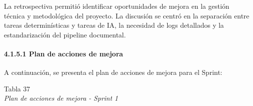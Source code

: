 \documentclass[12pt,a4paper,oneside]{report}
\begin{document}
La retrospectiva permitió identificar oportunidades de mejora en la
gestión técnica y metodológica del proyecto. La discusión se centró en
la separación entre tareas determinísticas y tareas de IA, la necesidad
de logs detallados y la estandarización del pipeline documental.

\paragraph{4.1.5.1 Plan de acciones de
mejora}\label{plan-de-acciones-de-mejora}

A continuación, se presenta el plan de acciones de mejora para el
Sprint:

\label{_Toc231672292}{}Tabla 37\\
\emph{Plan de acciones de mejora - Sprint 1}
\end{document}
